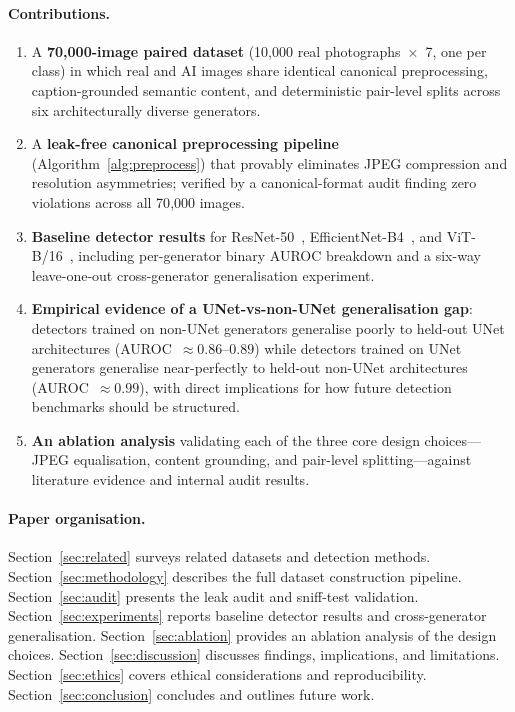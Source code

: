 \documentclass[journal]{IEEEtran}
\begin{document}
\paragraph{Contributions.}
\begin{enumerate}[leftmargin=1.2em, itemsep=2pt]
\item A \textbf{70{,}000-image paired dataset} (10{,}000 real
  photographs~$\times$~7, one per class) in which real and AI
  images share identical canonical preprocessing, caption-grounded
  semantic content, and deterministic pair-level splits across six
  architecturally diverse generators.
\item A \textbf{leak-free canonical preprocessing pipeline}
  (Algorithm~\ref{alg:preprocess}) that provably eliminates JPEG
  compression and resolution asymmetries; verified by a
  canonical-format audit finding zero violations across all
  70{,}000 images.
\item \textbf{Baseline detector results} for
  ResNet-50~\cite{he2016resnet},
  EfficientNet-B4~\cite{tan2019efficientnet}, and
  ViT-B/16~\cite{dosovitskiy2021vit}, including per-generator
  binary AUROC breakdown and a six-way leave-one-out cross-generator
  generalisation experiment.
\item \textbf{Empirical evidence of a UNet-vs-non-UNet
  generalisation gap}: detectors trained on non-UNet generators
  generalise poorly to held-out UNet architectures
  (AUROC~$\approx 0.86$--$0.89$) while detectors trained on UNet
  generators generalise near-perfectly to held-out non-UNet
  architectures (AUROC~$\approx 0.99$), with direct implications
  for how future detection benchmarks should be structured.
\item \textbf{An ablation analysis} validating each of the three
  core design choices---JPEG equalisation, content grounding, and
  pair-level splitting---against literature evidence and internal
  audit results.
\end{enumerate}

\paragraph{Paper organisation.}
Section~\ref{sec:related} surveys related datasets and detection
methods.
Section~\ref{sec:methodology} describes the full dataset construction
pipeline.
Section~\ref{sec:audit} presents the leak audit and sniff-test
validation.
Section~\ref{sec:experiments} reports baseline detector results and
cross-generator generalisation.
Section~\ref{sec:ablation} provides an ablation analysis of the
design choices.
Section~\ref{sec:discussion} discusses findings, implications, and
limitations.
Section~\ref{sec:ethics} covers ethical considerations and
reproducibility.
Section~\ref{sec:conclusion} concludes and outlines future work.
\end{document}
